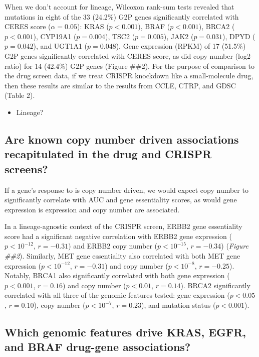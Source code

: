 \documentclass[man]{apa6}
\providecommand{\tightlist}{%
  \setlength{\itemsep}{0pt}\setlength{\parskip}{0pt}}
\begin{document}
When we don't account for lineage, Wilcoxon rank-sum tests revealed that
mutations in eight of the 33 (24.2\%) G2P genes significantly correlated
with CERES score (\(\alpha = 0.05\)): KRAS (\(p < 0.001\)), BRAF
(\(p < 0.001\)), BRCA2 (\(p < 0.001\)), CYP19A1 (\(p = 0.004\)), TSC2
(\(p = 0.005\)), JAK2 (\(p = 0.031\)), DPYD (\(p = 0.042\)), and UGT1A1
(\(p = 0.048\)). Gene expression (RPKM) of 17 (51.5\%) G2P genes
significantly correlated with CERES score, as did copy number
(log2-ratio) for 14 (42.4\%) G2P genes (Figure \#\#2). For the purpose
of comparison to the drug screen data, if we treat CRISPR knockdown like
a small-molecule drug, then these results are similar to the results
from CCLE, CTRP, and GDSC (Table 2).

\begin{itemize}
\tightlist
\item
  Lineage?
\end{itemize}

\subsection{Are known copy number driven associations recapitulated in
the drug and CRISPR
screens?}\label{are-known-copy-number-driven-associations-recapitulated-in-the-drug-and-crispr-screens}

If a gene's response to is copy number driven, we would expect copy
number to significantly correlate with AUC and gene essentiality scores,
as would gene expression is expression and copy number are associated.

In a lineage-agnostic context of the CRISPR screen, ERBB2 gene
essentiality score had a significant negative correlation with ERBB2
gene expression (\(p < 10^{-12}\), \(r = -0.31\)) and ERBB2 copy number
(\(p < 10^{-15}\), \(r = -0.34\)) (\emph{Figure \#\#2}). Similarly, MET
gene essentiality also correlated with both MET gene expression
(\(p < 10^{-12}\), \(r = -0.31\)) and copy number (\(p < 10^{-8}\),
\(r = -0.25\)). Notably, BRCA1 also significantly correlated with both
gene expression (\(p < 0.001\), \(r = 0.16\)) and copy number
(\(p < 0.01\), \(r = 0.14\)). BRCA2 significantly correlated with all
three of the genomic features tested: gene expression (\(p < 0.05\),
\(r = 0.10\)), copy number (\(p < 10^{-7}\), \(r = 0.23\)), and mutation
status (\(p < 0.001\)).

\subsection{Which genomic features drive KRAS, EGFR, and BRAF drug-gene
associations?}\label{which-genomic-features-drive-kras-egfr-and-braf-drug-gene-associations}
\end{document}
